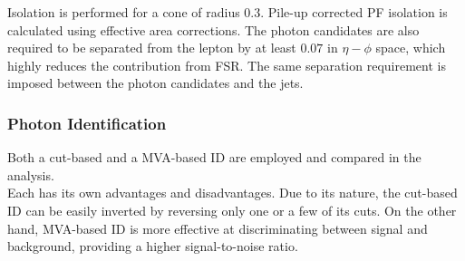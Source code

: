 %
%
%

Isolation is performed for a cone of radius 0.3.
Pile-up corrected PF isolation is calculated using effective area corrections.
The photon candidates are also required to be separated from the lepton by at least $0.07$ in $\eta-\phi$ space, which highly reduces the contribution from FSR.
The same separation requirement is imposed between the photon candidates and the jets.

\subsubsection{Photon Identification}
\label{sec:photonID}

Both a cut-based and a MVA-based ID are employed and compared in the analysis.\\
Each has its own advantages and disadvantages.
Due to its nature, the cut-based ID can be easily inverted by reversing only one or a few of its cuts.
On the other hand, MVA-based ID is more effective at discriminating between signal and background, providing a higher signal-to-noise ratio.


